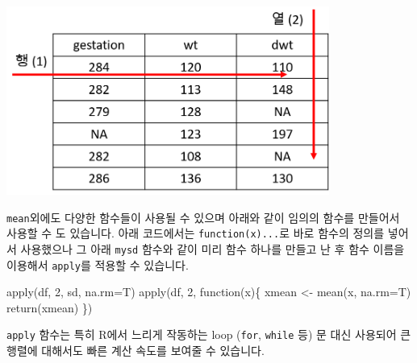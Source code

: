 \documentclass[
  a4paper,
]{book}
\newenvironment{Shaded}{\begin{snugshade}}{\end{snugshade}}
\newcommand{\AttributeTok}[1]{\textcolor[rgb]{0.40,0.45,0.13}{#1}}
\newcommand{\ControlFlowTok}[1]{\textcolor[rgb]{0.00,0.23,0.31}{#1}}
\newcommand{\DecValTok}[1]{\textcolor[rgb]{0.68,0.00,0.00}{#1}}
\newcommand{\FunctionTok}[1]{\textcolor[rgb]{0.28,0.35,0.67}{#1}}
\newcommand{\NormalTok}[1]{\textcolor[rgb]{0.00,0.23,0.31}{#1}}
\newcommand{\OtherTok}[1]{\textcolor[rgb]{0.00,0.23,0.31}{#1}}
\begin{document}
\includegraphics[width=4.16667in,height=\textheight]{images/07/01.png}

\texttt{mean}외에도 다양한 함수들이 사용될 수 있으며 아래와 같이 임의의
함수를 만들어서 사용할 수 도 있습니다. 아래 코드에서는
\texttt{function(x)...}로 바로 함수의 정의를 넣어서 사용했으나 그 아래
\texttt{mysd} 함수와 같이 미리 함수 하나를 만들고 난 후 함수 이름을
이용해서 \texttt{apply}를 적용할 수 있습니다.

\begin{Shaded}
\begin{Highlighting}[]
\FunctionTok{apply}\NormalTok{(df, }\DecValTok{2}\NormalTok{, sd, }\AttributeTok{na.rm=}\NormalTok{T)}
\FunctionTok{apply}\NormalTok{(df, }\DecValTok{2}\NormalTok{, }\ControlFlowTok{function}\NormalTok{(x)\{ }
\NormalTok{  xmean }\OtherTok{\textless{}{-}} \FunctionTok{mean}\NormalTok{(x, }\AttributeTok{na.rm=}\NormalTok{T) }
  \FunctionTok{return}\NormalTok{(xmean)}
\NormalTok{  \})}
\end{Highlighting}
\end{Shaded}

\texttt{apply} 함수는 특히 R에서 느리게 작동하는 loop (\texttt{for},
\texttt{while} 등) 문 대신 사용되어 큰 행렬에 대해서도 빠른 계산 속도를
보여줄 수 있습니다.
\end{document}

